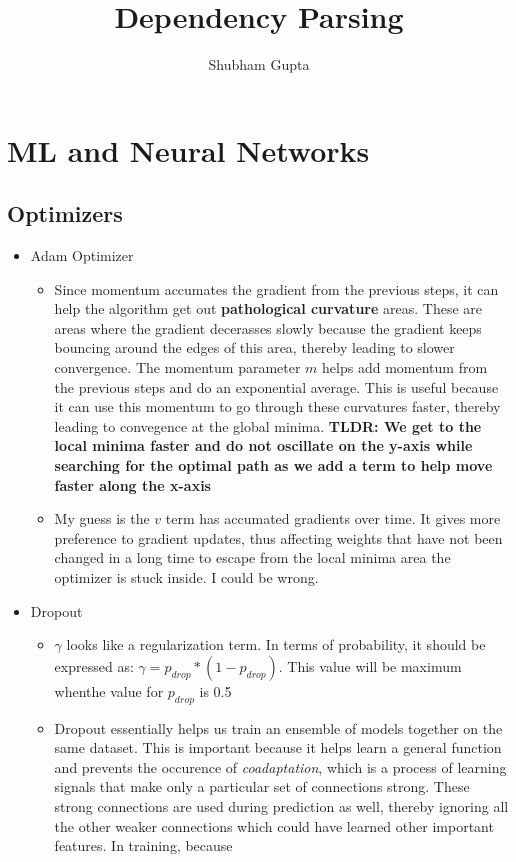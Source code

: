 \documentclass[a4paper]{article}
\title{Dependency Parsing}
\author{Shubham Gupta}
\begin{document}
\maketitle
\section{ML and Neural Networks}
\subsection{Optimizers}
\begin{itemize}
    \item Adam Optimizer
        \begin{itemize}
            \item Since momentum accumates the gradient from the previous steps, it can help the algorithm get out  \textbf{pathological curvature} areas. These are areas where the gradient decerasses slowly because the gradient keeps bouncing around the edges of this area, thereby leading to slower convergence. The momentum parameter $m$ helps add momentum from the previous steps and do an exponential average. This is useful because it can use this momentum to go through these curvatures faster,
                thereby leading to convegence at the global minima. \textbf{TLDR: We get to the local minima faster and do not oscillate on the y-axis while searching for the optimal path as we add a term to help move faster along the x-axis}
            \item My guess is the $v$ term has accumated gradients over time. It gives more preference to gradient updates, thus affecting weights that have not been changed in a long time to escape from the local minima area the optimizer is stuck inside. I could be wrong.
        \end{itemize}
    \item Dropout
        \begin{itemize}
            \item $\gamma$ looks like a regularization term. In terms of probability, it should be expressed as: $\gamma =  p_{drop} * (1 - p_{drop})$. This value will be maximum whenthe value for $p_{drop}$ is 0.5
            \item Dropout essentially helps us train an ensemble of models together on the same dataset. This is important because it helps learn a general function and prevents the occurence of \textit{coadaptation}, which is a process of learning signals that make only a particular set of connections strong. These strong connections are used during prediction as well, thereby ignoring all the other weaker connections which could have learned other important features. In training, because

\end{itemize}
\end{itemize}
\end{document}
